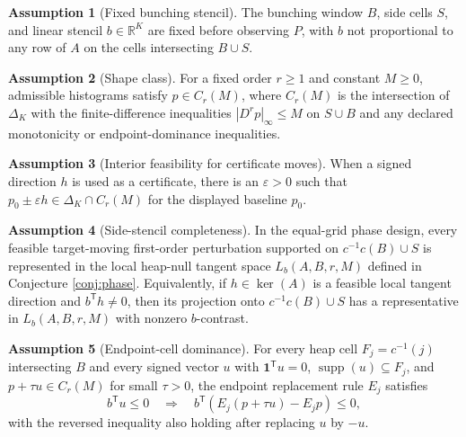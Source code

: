\documentclass[11pt]{article}
\newcommand{\one}{\mathbf{1}}
\newcommand{\transpose}{\mathsf{T}}
\newcommand{\R}{\mathbb{R}}
\theoremstyle{definition}
\newtheorem{assumption}{Assumption}
\theoremstyle{plain}
\theoremstyle{remark}
\begin{document}
\begin{assumption}[Fixed bunching stencil]\label{ass:stencil}
The bunching window $B$, side cells $S$, and linear stencil $b\in\R^K$ are fixed before observing $P$, with $b$ not proportional to any row of $A$ on the cells intersecting $B\cup S$.
\end{assumption}

\begin{assumption}[Shape class]\label{ass:shape}
For a fixed order $r\ge 1$ and constant $M\ge0$, admissible histograms satisfy $p\in C_r(M)$, where $C_r(M)$ is the intersection of $\Delta_K$ with the finite-difference inequalities $|D^r p|_\infty\le M$ on $S\cup B$ and any declared monotonicity or endpoint-dominance inequalities.
\end{assumption}

\begin{assumption}[Interior feasibility for certificate moves]\label{ass:interior}
When a signed direction $h$ is used as a certificate, there is an $\varepsilon>0$ such that $p_0\pm\varepsilon h\in\Delta_K\cap C_r(M)$ for the displayed baseline $p_0$.
\end{assumption}

\begin{assumption}[Side-stencil completeness]\label{ass:complete}
In the equal-grid phase design, every feasible target-moving first-order perturbation supported on $c^{-1}c(B)\cup S$ is represented in the local heap-null tangent space $L_b(A,B,r,M)$ defined in Conjecture \ref{conj:phase}. Equivalently, if $h\in\ker(A)$ is a feasible local tangent direction and $b^\transpose h\ne0$, then its projection onto $c^{-1}c(B)\cup S$ has a representative in $L_b(A,B,r,M)$ with nonzero $b$-contrast.
\end{assumption}

\begin{assumption}[Endpoint-cell dominance]\label{ass:dominance}
For every heap cell $F_j=c^{-1}(j)$ intersecting $B$ and every signed vector $u$ with $\one^\transpose u=0$, $\operatorname{supp}(u)\subseteq F_j$, and $p+\tau u\in C_r(M)$ for small $\tau>0$, the endpoint replacement rule $E_j$ satisfies
\[
  b^\transpose u\le 0\quad\Longrightarrow\quad b^\transpose(E_j(p+\tau u)-E_jp)\le 0,
\]
with the reversed inequality also holding after replacing $u$ by $-u$.
\end{assumption}
\end{document}

